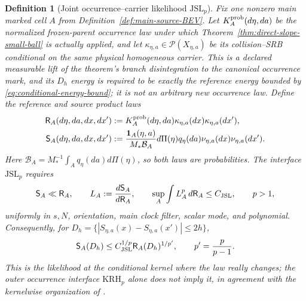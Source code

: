 \documentclass[11pt]{article}
\newtheorem{definition}[theorem]{Definition}
\newcommand{\one}{\mathbf 1}
\begin{document}
\begin{definition}[Joint occurrence--carrier likelihood
$\mathrm{JSL}_{p}$]
\label{def:joint-source-likelihood}
Fix one nonzero main marked cell $A$ from
Definition~\ref{def:main-source-BEV}.  Let
$K_A^{\rm prob}(d\eta,da)$ be the normalized frozen-parent occurrence law
under which Theorem~\ref{thm:direct-slope-small-ball} is actually applied,
and let $\kappa_{\eta,a}\in\mathcal P(X_{\eta,a})$ be its collision--SRB
conditional on the same physical homogeneous carrier.  This is a declared
measurable lift of the theorem's branch disintegration to the canonical
occurrence mark, and its $D_h$ energy is required to be exactly the reference
energy bounded by \eqref{eq:conditional-energy-bound}; it is not an arbitrary
new occurrence law.  Define the reference
and source product laws
\begin{align}
 \mathsf R_A(d\eta,da,dx,dx')
 &:=K_A^{\rm prob}(d\eta,da)
    \kappa_{\eta,a}(dx)\kappa_{\eta,a}(dx'),\notag\\
 \mathsf S_A(d\eta,da,dx,dx')
 &:=\frac{\one_A(\eta,a)}{M_*\mathcal B_A}
    d\Pi(\eta)q_\eta(da)
    \nu_{\eta,a}(dx)\nu_{\eta,a}(dx').
 \label{eq:joint-reference-source-laws}
\end{align}
Here $\mathcal B_A=M_*^{-1}\int_Aq_\eta(da)d\Pi(\eta)$, so both laws are
probabilities.  The interface $\mathrm{JSL}_p$ requires
\begin{equation}
\label{eq:joint-source-likelihood}
 \mathsf S_A\ll\mathsf R_A,
 \qquad L_A:=\frac{d\mathsf S_A}{d\mathsf R_A},
 \qquad
 \sup_A\int L_A^p\,d\mathsf R_A\le C_{\rm JSL},
 \qquad p>1,
\end{equation}
uniformly in $s,N$, orientation, main clock filter, scalar mode, and
polynomial.  Consequently, for
$D_h=\{|S_{\eta,a}(x)-S_{\eta,a}(x')|\le2h\}$,
\begin{equation}
\label{eq:joint-source-energy-transfer}
 \mathsf S_A(D_h)
 \le C_{\rm JSL}^{1/p}\mathsf R_A(D_h)^{1/p'},
 \qquad p'=\frac p{p-1}.
\end{equation}
This is the likelihood at the conditional kernel where the law really
changes; the outer occurrence interface $\mathrm{KRH}_p$ alone does not imply
it, in agreement with the kernelwise organization of \cite{NiKernel}.
\end{definition}
\end{document}
